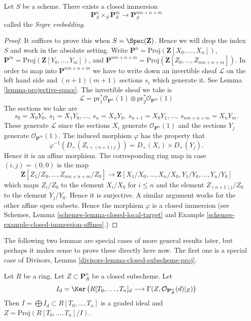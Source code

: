 \begin{lemma}
\label{lemma-segre-embedding}
Let $S$ be a scheme. There exists a closed immersion
$$
\mathbf{P}^n_S \times_S \mathbf{P}^m_S
\longrightarrow
\mathbf{P}^{nm + n + m}_S
$$
called the {\it Segre embedding}.
\end{lemma}

\begin{proof}
It suffices to prove this when $S = \Spec(\mathbf{Z})$.
Hence we will drop the index $S$ and work in the absolute setting.
Write $\mathbf{P}^n = \text{Proj}(\mathbf{Z}[X_0, \ldots, X_n])$,
$\mathbf{P}^m = \text{Proj}(\mathbf{Z}[Y_0, \ldots, Y_m])$,
and
$\mathbf{P}^{nm + n + m} =
\text{Proj}(\mathbf{Z}[Z_0, \ldots, Z_{nm + n + m}])$.
In order to map into $\mathbf{P}^{nm + n + m}$ we have to
write down an invertible sheaf $\mathcal{L}$ on the left hand
side and $(n + 1)(m + 1)$ sections $s_i$ which generate it.
See Lemma \ref{lemma-projective-space}.
The invertible sheaf we take is
$$
\mathcal{L} =
\text{pr}_1^*\mathcal{O}_{\mathbf{P}^n}(1)
\otimes
\text{pr}_2^*\mathcal{O}_{\mathbf{P}^m}(1)
$$
The sections we take are
$$
s_0 = X_0Y_0, \ s_1 = X_1Y_0, \ldots, \ s_n = X_nY_0,
\ s_{n + 1} = X_0Y_1, \ldots, \ s_{nm + n + m} = X_nY_m.
$$
These generate $\mathcal{L}$ since the sections $X_i$ generate
$\mathcal{O}_{\mathbf{P}^n}(1)$ and the sections $Y_j$ generate
$\mathcal{O}_{\mathbf{P}^m}(1)$. The induced morphism
$\varphi$ has the property that
$$
\varphi^{-1}(D_{+}(Z_{i + (n + 1)j})) = D_{+}(X_i) \times D_{+}(Y_j).
$$
Hence it is an affine morphism. The corresponding ring map in case
$(i, j) = (0, 0)$ is the map
$$
\mathbf{Z}[Z_1/Z_0, \ldots, Z_{nm + n + m}/Z_0]
\longrightarrow
\mathbf{Z}[X_1/X_0, \ldots, X_n/X_0, Y_1/Y_0, \ldots, Y_n/Y_0]
$$
which maps $Z_i/Z_0$ to the element $X_i/X_0$ for $i \leq n$ and
the element $Z_{(n + 1)j}/Z_0$ to the element $Y_j/Y_0$. Hence it
is surjective. A similar argument works for the other affine
open subsets. Hence the morphism $\varphi$ is a closed immersion
(see Schemes, Lemma \ref{schemes-lemma-closed-local-target} and
Example \ref{schemes-example-closed-immersion-affines}.)
\end{proof}

\noindent
The following two lemmas are special cases of more general results later, but
perhaps it makes sense to prove these directly here now. The first one is
a special case of Divisors, Lemma \ref{divisors-lemma-closed-subscheme-proj}.

\begin{lemma}
\label{lemma-closed-in-projective-space}
Let $R$ be a ring. Let $Z \subset \mathbf{P}^n_R$ be a closed subscheme.
Let
$$
I_d = \Ker\left(
R[T_0, \ldots, T_n]_d
\longrightarrow
\Gamma(Z, \mathcal{O}_{\mathbf{P}^n_R}(d)|_Z)\right)
$$
Then $I = \bigoplus I_d \subset R[T_0, \ldots, T_n]$ is
a graded ideal and $Z = \text{Proj}(R[T_0, \ldots, T_n]/I)$.
\end{lemma}


